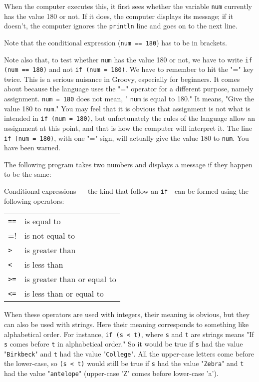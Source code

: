 When the computer executes this, it first sees whether the variable \verb!num!
currently has the value 180 or not.  If it does, the computer displays
its message; if it doesn't, the computer ignores the  \verb!println! line
and goes on to the next line.

Note that the conditional expression (\verb!num == 180!) has to be
in brackets.

Note also that, to test whether  \verb!num! has the value 180
or not, we have to write \verb!if (num == 180)! and not \verb!if (num = 180)!.
We have to remember to hit the "=" key twice.
This is a serious nuisance in Groovy, especially for beginners.
It comes about because the language uses the "=" operator for a different
purpose, namely assignment.  \verb!num = 180! does not mean, " \verb!num! is
equal to 180."  It means, "Give the value 180 to  \verb!num!."  You may feel
that it is obvious that assignment is not what is intended in
\verb!if (num = 180)!, but unfortunately the rules of the language allow
an assignment at this point, and that is
how the computer will interpret it.  The line \verb!if (num = 180)!,
with one "=" sign, will actually give the value 180 to  \verb!num!.
You have been warned.

The following program takes two numbers and displays a message if they happen
to be the same:


Conditional expressions --- the kind that follow an \verb!if! -
can be formed using the following operators:

\begin{tabular}{ll}
\verb!==! &is equal to\\
\verb!!=! &is not equal to\\
\verb!>! &is greater than\\
\verb!<! &is less than\\
\verb!>=! & is greater than or equal to\\
\verb!<=! &is less than or equal to\\
\end{tabular}

When these operators are used with integers, their meaning is obvious,
but they can also be used with strings.  Here their meaning corresponds
to something like alphabetical order.  For instance, \verb!if (s < t)!,
where  \verb!s! and \verb!t! are strings means "If  \verb!s! comes before \verb!t!
in alphabetical order."  So it would be true if  \verb!s! had the value
"\verb!Birkbeck!" and \verb!t! had the value "\verb!College!".  All the
upper-case letters come before the lower-case, so \verb!(s < t)! would
still be true if  \verb!s! had the value "\verb!Zebra!" and \verb!t! had the
value "\verb!antelope!" (upper-case 'Z' comes before lower-case 'a').

